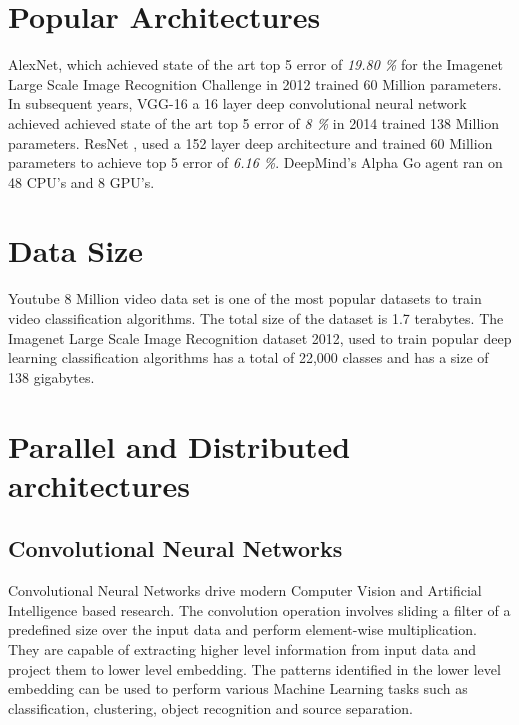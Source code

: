 \documentclass[sigconf]{acmart}
\begin{document}
\section{Popular Architectures}\label{art}

AlexNet\cite{NIPS2012-4824}, which achieved state of the art top 5 error of \textit{19.80 \%} for the Imagenet Large Scale Image Recognition Challenge in 2012 trained 60 Million parameters. In subsequent years, VGG-16 \cite{DBLP:journals/corr/SimonyanZ14a} a 16 layer deep convolutional neural network achieved achieved state of the art top 5 error of \textit{8 \%} in 2014 trained 138 Million parameters. ResNet \cite{DBLP:journals/corr/HeZRS15}, used a 152 layer deep architecture and trained 60 Million parameters to achieve top 5 error of \textit{6.16 \%}. DeepMind's Alpha Go agent ran on 48 CPU's and 8 GPU's. 

\section{Data Size} \label{size}

Youtube 8 Million video data set is one of the most popular datasets to train video classification algorithms. The total size of the dataset is 1.7 terabytes. The Imagenet Large Scale Image Recognition dataset 2012, used to train popular deep learning classification algorithms has a total of 22,000 classes and has a size of 138 gigabytes.  

\section{Parallel and Distributed architectures} \label{parallel}

\subsection{Convolutional Neural Networks}

Convolutional Neural Networks drive modern Computer Vision and Artificial Intelligence based research. The convolution operation involves sliding a filter of a predefined size over the input data and perform element-wise multiplication. They are capable of extracting higher level information from input data and project them to lower level embedding. The patterns identified in the lower level embedding can be used to perform various Machine Learning tasks such as classification, clustering, object recognition and source separation.
\end{document}
